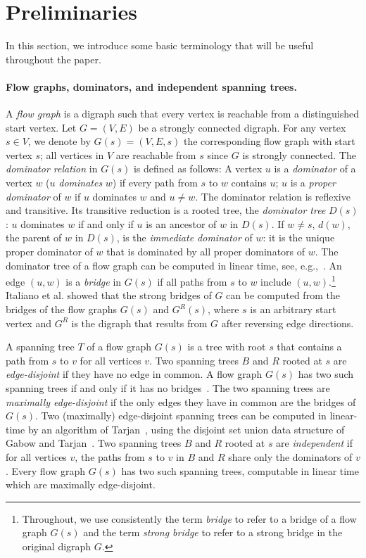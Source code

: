 \documentclass[11pt]{article}
\begin{document}
\section{Preliminaries}
\label{sec:dominators}



In this section, we introduce some basic terminology that will be useful throughout the paper.

\paragraph{Flow graphs, dominators, and independent spanning trees.}
A \emph{flow graph} is a digraph such that every vertex
is reachable from a distinguished start vertex. Let $G=(V,E)$ be a
strongly connected digraph. For any vertex $s \in V$, we denote by
$G(s)=(V,E,s)$ the corresponding flow graph with start vertex $s$;
all vertices in $V$ are reachable from $s$ since $G$ is strongly
connected. The \emph{dominator relation} in $G(s)$ is defined as
follows: A vertex $u$ is a \emph{dominator} of a vertex $w$ ($u$
\emph{dominates} $w$) if every path from $s$ to $w$ contains $u$;
$u$ is a \emph{proper dominator} of $w$ if $u$ dominates $w$ and
$u \not= w$.  The dominator relation is reflexive and transitive.
Its transitive reduction is a rooted tree, the \emph{dominator
tree} $D(s)$: $u$ dominates $w$ if and only if $u$ is an ancestor
of $w$ in $D(s)$. If $w \not= s$, $d(w)$, the parent of $w$ in
$D(s)$, is the \emph{immediate dominator} of $w$: it is the unique
proper dominator of $w$ that is dominated by all proper dominators
of $w$. The dominator tree of a flow graph can be computed in
linear time, see, e.g.,~\cite{domin:ahlt,dominators:bgkrtw}. An
edge $(u,w)$ is a \emph{bridge} in $G(s)$ if all paths from $s$ to
$w$ include $(u,w)$.\footnote{Throughout,
we use consistently the term  \emph{bridge} to refer to a bridge of a flow graph $G(s)$ and the term \emph{strong bridge} to refer to a strong bridge in the original digraph $G$.}
Italiano et al. \cite{Italiano2012} showed that
the strong bridges of $G$
can be computed from the bridges of the flow graphs $G(s)$ and $G^R(s)$, where $s$ is an arbitrary start vertex and $G^R$ is the digraph that results from $G$ after reversing edge directions.

A spanning tree $T$ of a flow graph $G(s)$ is a tree with root $s$ that contains a path from $s$ to $v$ for all vertices $v$.
Two spanning trees $B$ and $R$ rooted at $s$ are \emph{edge-disjoint} if they have no edge in common. A flow graph $G(s)$ has two such spanning trees if and only if it has no bridges~\cite{st:t}. The two spanning trees are \emph{maximally edge-disjoint} if the only edges they have in common are the bridges of $G(s)$. Two (maximally) edge-disjoint spanning trees can be computed in linear-time by an algorithm of Tarjan~\cite{st:t}, using the disjoint set union data structure of Gabow and Tarjan~\cite{dsu:gt}.
Two spanning trees $B$ and $R$ rooted at $s$ are \emph{independent} if for all vertices $v$, the paths from $s$ to $v$ in $B$ and $R$ share only the dominators of $v$. Every flow graph $G(s)$ has two such spanning trees, computable in linear time \cite{domv:gt05,domcert} which are maximally edge-disjoint.
\end{document}
